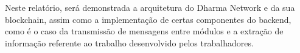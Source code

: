 Neste relatório, será demonstrada a arquitetura do Dharma Network e da sua blockchain, assim como a implementação de certas componentes do backend, como é o caso da transmissão de mensagens entre módulos e a extração de informação referente ao trabalho desenvolvido pelos trabalhadores.


\vspace*{2cm}


